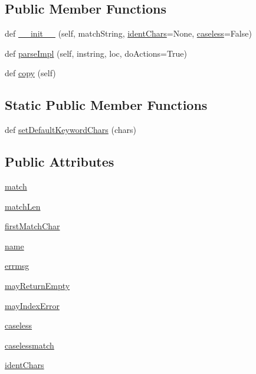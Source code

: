 \subsection*{Public Member Functions}
\begin{DoxyCompactItemize}
\item 
def \hyperlink{classpyparsing_1_1Keyword_a1c6e47343d4a5f9debcd3a7eb39f3340}{\+\_\+\+\_\+init\+\_\+\+\_\+} (self, match\+String, \hyperlink{classpyparsing_1_1Keyword_aa72a7dfb352a7054aded6f295162b474}{ident\+Chars}=None, \hyperlink{classpyparsing_1_1Keyword_ab6e20da726b890b59e65914922b5136f}{caseless}=False)
\item 
def \hyperlink{classpyparsing_1_1Keyword_a10e8eeb1be8ff94c303277f61d235ef8}{parse\+Impl} (self, instring, loc, do\+Actions=True)
\item 
def \hyperlink{classpyparsing_1_1Keyword_a1937fea0989350cba95fa450d120122b}{copy} (self)
\end{DoxyCompactItemize}
\subsection*{Static Public Member Functions}
\begin{DoxyCompactItemize}
\item 
def \hyperlink{classpyparsing_1_1Keyword_a0ea435e1d1eb73725344c879a160baa7}{set\+Default\+Keyword\+Chars} (chars)
\end{DoxyCompactItemize}
\subsection*{Public Attributes}
\begin{DoxyCompactItemize}
\item 
\hyperlink{classpyparsing_1_1Keyword_ad18582670ed6dc0ff10e30b56f6f5d4b}{match}
\item 
\hyperlink{classpyparsing_1_1Keyword_a7e92d7225910108908b4a4c54e2ad07a}{match\+Len}
\item 
\hyperlink{classpyparsing_1_1Keyword_ae5900dc1e1643cd965966e0baed2750e}{first\+Match\+Char}
\item 
\hyperlink{classpyparsing_1_1Keyword_a6b599732424c7bb8990dd264529b4289}{name}
\item 
\hyperlink{classpyparsing_1_1Keyword_af771877560df397f8ab35b2f9656442b}{errmsg}
\item 
\hyperlink{classpyparsing_1_1Keyword_a6c6f63414fbe51b344efaeac06c1de27}{may\+Return\+Empty}
\item 
\hyperlink{classpyparsing_1_1Keyword_aa65717a50908b0eaf79d8743f3b0705f}{may\+Index\+Error}
\item 
\hyperlink{classpyparsing_1_1Keyword_ab6e20da726b890b59e65914922b5136f}{caseless}
\item 
\hyperlink{classpyparsing_1_1Keyword_a7fc2866cd13907783d2a1e10ae239868}{caselessmatch}
\item 
\hyperlink{classpyparsing_1_1Keyword_aa72a7dfb352a7054aded6f295162b474}{ident\+Chars}
\end{DoxyCompactItemize}
